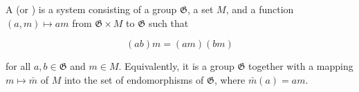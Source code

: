 A  (or ) is a system consisting of a group $\mathfrak{G}$, a set $M$, and a function $(a, m) \mapsto am$ from $\mathfrak{G} \times M$ to $\mathfrak{G}$ such that

$$(ab)m = (am)(bm)$$

for all $a, b \in \mathfrak{G}$ and $m \in M$. Equivalently, it is a group $\mathfrak{G}$ together with a mapping $m \mapsto \bar{m}$ of $M$ into the set of endomorphisms of $\mathfrak{G}$, where $\bar{m}(a) = am$.
